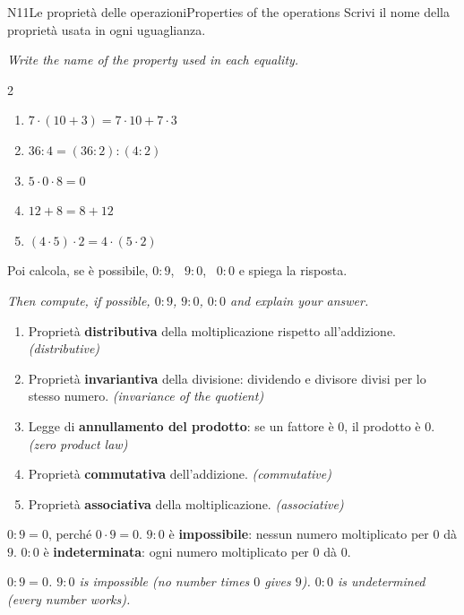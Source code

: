 \documentclass[11pt,a4paper]{article}
\newcommand{\en}[1]{\par{\small\itshape\color{engray}#1\par}}
\newcommand{\enx}[1]{{\small\itshape\color{engray}(#1)}}
\begin{document}
\begin{esercizio}{N1}{1}{Le proprietà delle operazioni}{Properties of the operations}
Scrivi il nome della proprietà usata in ogni uguaglianza.
\en{Write the name of the property used in each equality.}
\begin{multicols}{2}
\begin{enumerate}
\item $7\cdot(10+3)=7\cdot10+7\cdot3$
\item $36:4=(36:2):(4:2)$
\item $5\cdot 0\cdot 8=0$
\item $12+8=8+12$
\item $(4\cdot 5)\cdot 2=4\cdot(5\cdot 2)$
\end{enumerate}
\end{multicols}
\vspace{-4pt}
Poi calcola, se è possibile, $0:9$, \ $9:0$, \ $0:0$ e spiega la risposta.
\en{Then compute, if possible, $0:9$, $9:0$, $0:0$ and explain your answer.}
\end{esercizio}
\begin{solbox}
\begin{enumerate}
\item Proprietà \textbf{distributiva} della moltiplicazione rispetto all'addizione. \enx{distributive}
\item Proprietà \textbf{invariantiva} della divisione: dividendo e divisore divisi per lo stesso numero. \enx{invariance of the quotient}
\item Legge di \textbf{annullamento del prodotto}: se un fattore è $0$, il prodotto è $0$. \enx{zero product law}
\item Proprietà \textbf{commutativa} dell'addizione. \enx{commutative}
\item Proprietà \textbf{associativa} della moltiplicazione. \enx{associative}
\end{enumerate}
$0:9=0$, perché $0\cdot 9=0$.\quad
$9:0$ è \textbf{impossibile}: nessun numero moltiplicato per $0$ dà $9$.\quad
$0:0$ è \textbf{indeterminata}: ogni numero moltiplicato per $0$ dà $0$.
\en{$0:9=0$. $9:0$ is impossible (no number times $0$ gives $9$). $0:0$ is undetermined (every number works).}
\end{solbox}
\end{document}
